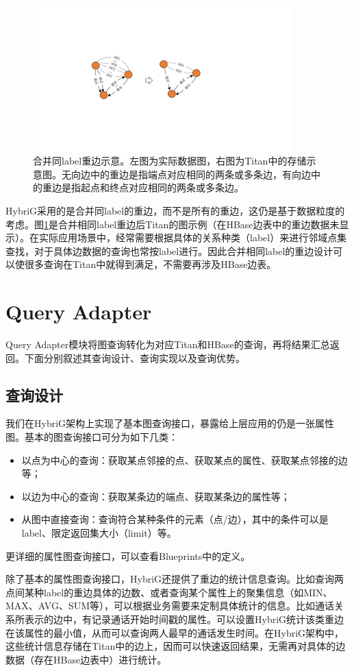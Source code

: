 \begin{figure}[htbp]
\centering
\includegraphics[width=100mm]{fig/merge_edges.pdf}
\caption[合并同label重边示意图]{合并同label重边示意。左图为实际数据图，右图为Titan中的存储示意图。无向边中的重边是指端点对应相同的两条或多条边，有向边中的重边是指起点和终点对应相同的两条或多条边。}
\label{fig:merge_edges}
\end{figure}

HybriG采用的是合并同label的重边，而不是所有的重边，这仍是基于数据粒度的考虑。图\ref{fig:merge_edges}是合并相同label重边后Titan的图示例（在HBase边表中的重边数据未显示）。在实际应用场景中，经常需要根据具体的关系种类（label）来进行邻域点集查找，对于具体边数据的查询也常按label进行。因此合并相同label的重边设计可以使很多查询在Titan中就得到满足，不需要再涉及HBase边表。


\section{Query Adapter}
Query Adapter模块将图查询转化为对应Titan和HBase的查询，再将结果汇总返回。下面分别叙述其查询设计、查询实现以及查询优势。
\subsection{查询设计}
我们在HybriG架构上实现了基本图查询接口，暴露给上层应用的仍是一张属性图。基本的图查询接口可分为如下几类：
\begin{itemize}
	\item 以点为中心的查询：获取某点邻接的点、获取某点的属性、获取某点邻接的边等；
	\item 以边为中心的查询：获取某条边的端点、获取某条边的属性等；
	\item 从图中直接查询：查询符合某种条件的元素（点/边），其中的条件可以是label、限定返回集大小（limit）等。
\end{itemize}
更详细的属性图查询接口，可以查看Blueprints中的定义。

除了基本的属性图查询接口，HybriG还提供了重边的统计信息查询。比如查询两点间某种label的重边具体的边数、或者查询某个属性上的聚集信息（如MIN、MAX、AVG、SUM等），可以根据业务需要来定制具体统计的信息。比如通话关系所表示的边中，有记录通话开始时间戳的属性。可以设置HybriG统计该类重边在该属性的最小值，从而可以查询两人最早的通话发生时间。在HybriG架构中，这些统计信息存储在Titan中的边上，因而可以快速返回结果，无需再对具体的边数据（存在HBase边表中）进行统计。

